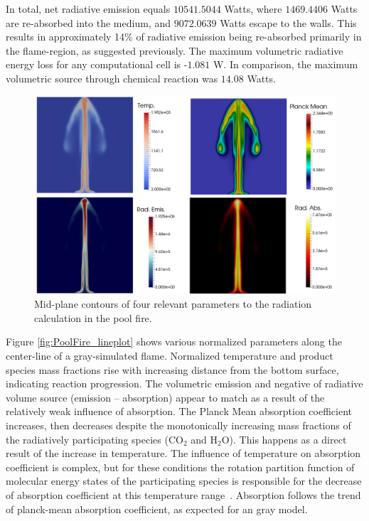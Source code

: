 In total, net radiative emission equals $10541.5044$ Watts, where $1469.4406$ Watts are re-absorbed into the medium, and $9072.0639$ Watts escape to the walls. This results in approximately 14\% of radiative emission being re-absorbed primarily in the flame-region, as suggested previously. 
The maximum volumetric radiative energy loss for any computational cell is -$1.081$ W. In comparison, the maximum volumetric source through chemical reaction was $14.08$ Watts.

\begin{figure}
\includegraphics[width=\linewidth]{figures/ch4/PoolFire_quadcomparison.png}
\caption{Mid-plane contours of four relevant parameters to the radiation calculation in the pool fire.}
\label{fig:PoolFire_quadcomparison}
\end{figure}

Figure \ref{fig:PoolFire_lineplot} shows various normalized parameters along the center-line of a gray-simulated flame. 
Normalized temperature and product species mass fractions rise with increasing distance from the bottom surface, indicating reaction progression. 
The volumetric emission and negative of radiative volume source (emission – absorption) appear to match as a result of the relatively weak influence of absorption.
The Planck Mean absorption coefficient increases, then decreases despite the monotonically increasing mass fractions of the radiatively participating species (CO$_2$ and H$_2$O). This happens as a direct result of the increase in temperature. 
The influence of temperature on absorption coefficient is complex, but for these conditions the rotation partition function of molecular energy states of the participating species is responsible for the decrease of absorption coefficient at this temperature range~\cite{Modest2013RadiativeTransfer}.
Absorption follows the trend of planck-mean absorption coefficient, as expected for an gray model.

